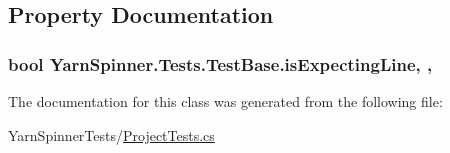 \subsection{Property Documentation}
\hypertarget{a00144_a47f35b8e8123ed9471883d02b8bc9f3e}{
\subsubsection[{is\-Expecting\-Line}]{\setlength{\rightskip}{0pt plus 5cm}bool Yarn\-Spinner.\-Tests.\-Test\-Base.\-is\-Expecting\-Line\hspace{0.3cm}{\ttfamily [get]}, {\ttfamily [protected]}, {\ttfamily [inherited]}}}\label{a00144_a47f35b8e8123ed9471883d02b8bc9f3e}


The documentation for this class was generated from the following file\-:\begin{DoxyCompactItemize}
\item 
Yarn\-Spinner\-Tests/\hyperlink{a00278}{Project\-Tests.\-cs}\end{DoxyCompactItemize}
